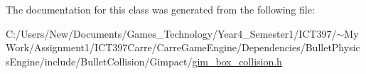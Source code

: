 The documentation for this class was generated from the following file:\begin{CompactItemize}
\item 
C:/Users/New/Documents/Games\_\-Technology/Year4\_\-Semester1/ICT397/$\sim$My Work/Assignment1/ICT397Carre/CarreGameEngine/Dependencies/BulletPhysicsEngine/include/BulletCollision/Gimpact/\hyperlink{gim__box__collision_8h}{gim\_\-box\_\-collision.h}\end{CompactItemize}
